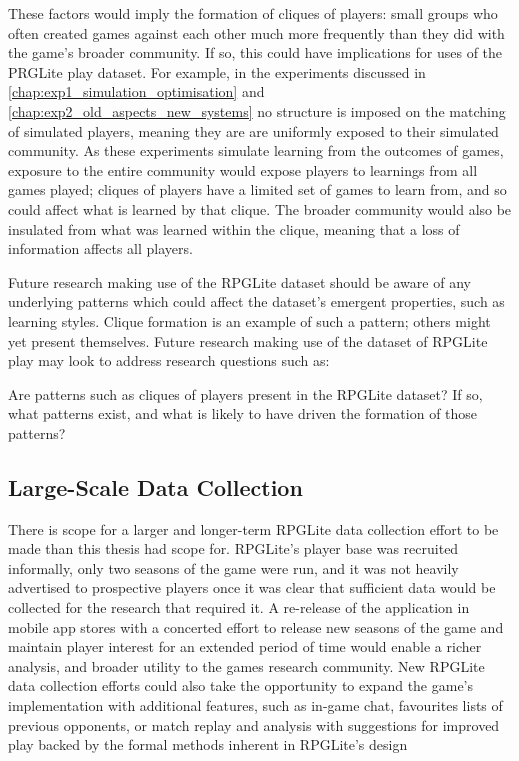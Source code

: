 These factors would imply the formation of cliques of players: small groups who
often created games against each other much more frequently than they did with
the game's broader community. If so, this could have implications for uses of
the PRGLite play dataset. For example, in the experiments discussed in
\cref{chap:exp1_simulation_optimisation} and
\cref{chap:exp2_old_aspects_new_systems} no structure is imposed on the matching
of simulated players, meaning they are are uniformly exposed to their simulated
community. As these experiments simulate learning from the outcomes of games,
exposure to the entire community would expose players to learnings from all
games played; cliques of players have a limited set of games to learn from, and
so could affect what is learned by that clique. The broader community would also
be insulated from what was learned within the clique, meaning that a loss of
information affects all players.

Future research making use of the RPGLite dataset should be aware of any
underlying patterns which could affect the dataset's emergent properties, such
as learning styles. Clique formation is an example of such a pattern; others
might yet present themselves. Future research making use of the dataset of
RPGLite play may look to address research questions such as:

\begin{researchquestion}
    Are patterns such as cliques of players present in the RPGLite dataset? If
    so, what patterns exist, and what is likely to have driven the formation of
    those patterns?
\end{researchquestion}

    

\subsection{Large-Scale Data
Collection}
\label{future_work_rpglite_large_scale_data_collection}

There is scope for a larger and longer-term RPGLite data collection effort to be
made than this thesis had scope for. RPGLite's player base was recruited
informally, only two seasons of the game were run, and it was not heavily
advertised to prospective players once it was clear that sufficient data would
be collected for the research that required it. A re-release of the application
in mobile app stores with a concerted effort to release new seasons of the game
and maintain player interest for an extended period of time would enable a
richer analysis, and broader utility to the games research community. New
RPGLite data collection efforts could also take the opportunity to expand the
game's implementation with additional features, such as in-game chat, favourites
lists of previous opponents, or match replay and analysis with suggestions for
improved play backed by the formal methods inherent in RPGLite's design


